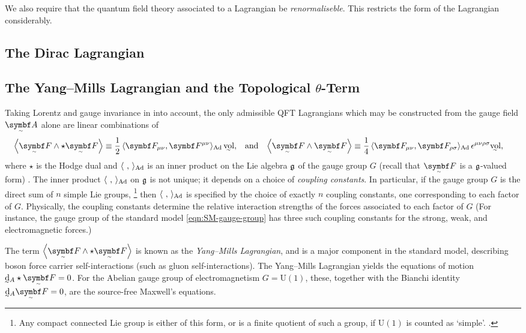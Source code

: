 We also require that the quantum field theory associated to a Lagrangian be \emph{renormaliseble}.
This restricts the form of the Lagrangian considerably.


\subsection{The Dirac Lagrangian}

\subsection{The Yang--Mills Lagrangian and the Topological \texorpdfstring{$\theta$-Term}{θ-Term}}
\label{sec:YM-and-topological}

Taking Lorentz and gauge invariance in into account, the only admissible QFT Lagrangians which may be constructed from the gauge field $\tsbm A$ alone are linear combinations of
\begin{align}
	\ang{\tsbm F \wedge \star\tsbm F} &\equiv \frac12\angg{\bm F_{\mu\nu}, \bm F^{\mu\nu}}\vol
,&	&\text{and}
&	\ang{\tsbm F \wedge \tsbm F} &\equiv \frac14\angg{\bm F_{\mu\nu}, \bm F_{\rho\sigma}}\epsilon^{\mu\nu\rho\sigma}\vol
,\end{align}
where $\star$ is the Hodge dual and $\angg{\ ,\ }$ is an inner product on the Lie algebra $\frak g$ of the gauge group $G$ (recall that $\tsbm F$ is a $\frak g$-valued form) \cite[§\,7.1.2]{Hamilton_2017}.
The inner product $\angg{\ ,\ }$ on $\frak g$ is not unique; it depends on a choice of \emph{coupling constants}.
In particular, if the gauge group $G$ is the direct sum of $n$ simple Lie groups,%
\footnote{
	Any compact connected Lie group is either of this form, or is a finite quotient of such a group, if $\mathrm U(1)$ is counted as `simple'. \cite[§\,2.4.3]{Hamilton_2017}.
}
then $\angg{\ ,\ }$ is specified by the choice of exactly $n$ coupling constants, one corresponding to each factor of $G$.
Physically, the coupling constants determine the relative interaction strengths of the forces associated to each factor of $G$ \cite[§\,2.5]{Hamilton_2017}
(For instance, the gauge group of the standard model \eqref{eqn:SM-gauge-group} has three such coupling constants for the strong, weak, and electromagnetic forces.)

The term $\ang{\tsbm F \wedge\star \tsbm F}$ is known as the \emph{Yang--Mills Lagrangian}, and is a major component in the standard model, describing boson force carrier self-interactions (such as gluon self-interactions).
The Yang--Mills Lagrangian yields the equations of motion $\ts\dd_A\star\tsbm F = 0$.
For the Abelian gauge group of electromagnetism $G = \mathrm{U}(1)$, these, together with the Bianchi identity $\ts\dd_A\tsbm F = 0$, are the source-free Maxwell's equations.


